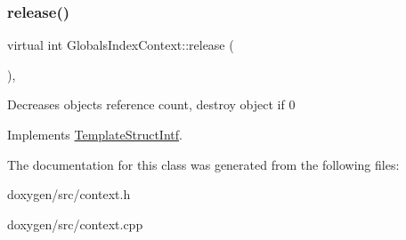 \mbox{\label{class_globals_index_context_a65ba296c4327f8628017e4a1073237e3}} 
\subsubsection{\texorpdfstring{release()}{release()}}
{\footnotesize\ttfamily virtual int Globals\+Index\+Context\+::release (\begin{DoxyParamCaption}{ }\end{DoxyParamCaption})\hspace{0.3cm}{\ttfamily [inline]}, {\ttfamily [virtual]}}

Decreases object\textquotesingle{}s reference count, destroy object if 0 

Implements \mbox{\hyperlink{class_template_struct_intf_a3dce7dd29d3f66a8080b40578e8a5045}{Template\+Struct\+Intf}}.



The documentation for this class was generated from the following files\+:\begin{DoxyCompactItemize}
\item 
doxygen/src/context.\+h\item 
doxygen/src/context.\+cpp\end{DoxyCompactItemize}
